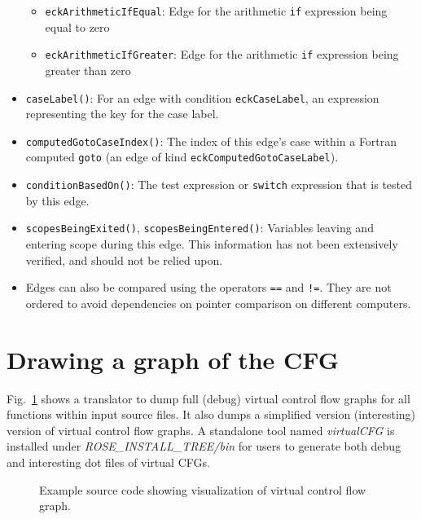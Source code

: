 \begin{itemize}
\begin{itemize}
  \item \lstinline{eckArithmeticIfEqual}: Edge for the arithmetic \lstinline{if} expression being equal to zero
  \item \lstinline{eckArithmeticIfGreater}: Edge for the arithmetic \lstinline{if} expression being greater than zero
  \end{itemize}
\item \lstinline{caseLabel()}: For an edge with condition
      \lstinline{eckCaseLabel}, an expression representing the key for the case
      label.
\item \lstinline{computedGotoCaseIndex()}: The index of this edge's case
      within a Fortran computed \lstinline{goto} (an edge of kind
      \lstinline{eckComputedGotoCaseLabel}).
\item \lstinline{conditionBasedOn()}: The test expression or
      \lstinline{switch} expression that is tested by this edge.
\item \lstinline{scopesBeingExited()}, \lstinline{scopesBeingEntered()}:
      Variables leaving and entering scope during this edge.  This information
      has not been extensively verified, and should not be relied upon.
\item Edges can also be compared using the operators \lstinline{==} and
      \lstinline{!=}.  They are not ordered to avoid dependencies on pointer
      comparison on different computers.
\end{itemize}

\section{Drawing a graph of the CFG}
Fig.~\ref{Tutorial:BuildVirtualCFG1} shows a translator to dump 
full (debug) virtual control flow graphs for all functions within input
source files. It also dumps a simplified version (interesting) version of 
virtual control flow graphs. A standalone tool named \textit{virtualCFG} is
installed under \textit{ROSE\_INSTALL\_TREE/bin} for users to generate both
debug and interesting dot files of virtual CFGs. 

\begin{figure}[!h]
{\indent
  {\mySmallFontSize
    \begin{latexonly}
    
    \end{latexonly}

    \begin{htmlonly}
    
    \end{htmlonly}

  }
}
\label{Tutorial:BuildVirtualCFG1}
\caption{Example source code showing visualization of virtual control flow graph.}
\end{figure}



